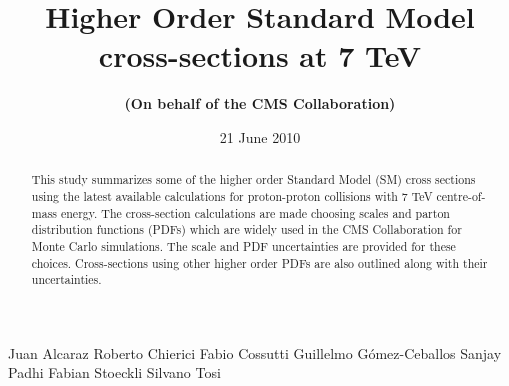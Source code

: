 \documentclass{cmspaper_pdf}
\begin{document}

\begin{titlepage}

  \date{21 June 2010}

  \title{Higher Order Standard Model \\
         cross-sections at 7 TeV}

  \begin{Authlist}
     Juan Alcaraz
     Roberto Chierici
    Fabio Cossutti 
    Guillelmo G\'omez-Ceballos 
    Sanjay Padhi
    Fabian Stoeckli
    Silvano Tosi

  \end{Authlist}

  \author{\bf(On behalf of the CMS Collaboration)}

  \begin{abstract}
This study summarizes some of the higher order Standard Model (SM) cross sections using the latest 
available calculations for proton-proton collisions with 7 TeV centre-of-mass 
energy. The cross-section calculations are made choosing scales and 
parton distribution functions (PDFs) which are widely used in the CMS Collaboration for Monte 
Carlo simulations. The scale and PDF uncertainties are provided 
for these choices. Cross-sections using other higher order PDFs are also 
outlined along with their uncertainties.
  \end{abstract}

\end{titlepage}

\setcounter{page}{2}%

%





\end{document}
